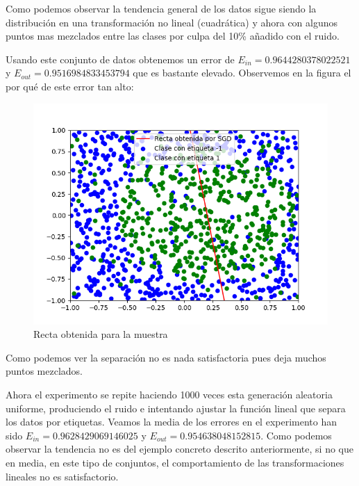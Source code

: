 \documentclass[12pt,a4paper]{article}
\begin{document}
Como podemos observar la tendencia general de los datos sigue siendo la distribución en una  transformación no lineal (cuadrática) y ahora con algunos puntos mas mezclados entre las clases por culpa del 10\% añadido con el ruido.

Usando este conjunto de datos obtenemos un error de $E_{in} = 0.9644280378022521$ y $E_{out} = 0.9516984833453794$ que es bastante elevado. Observemos en la figura el por qué de este error tan alto:

\begin{figure}[H]
	\centering
	\includegraphics[scale=0.8]{./Imagenes/ej2-2-4.png}
	\caption{Recta obtenida para la muestra}
	\label{ej2-2-4}
\end{figure}

Como podemos ver la separación no es nada satisfactoria pues deja muchos puntos mezclados.

Ahora el experimento se repite haciendo 1000 veces esta generación aleatoria uniforme, produciendo el ruido e intentando ajustar la función lineal que separa los datos por etiquetas. Veamos la media de los errores en el experimento han sido $E_{in} = 0.9628429069146025$ y $E_{out} = 0.954638048152815$. Como podemos observar la tendencia no es del ejemplo concreto descrito anteriormente, si no que en media, en este tipo de conjuntos, el comportamiento de las transformaciones lineales no es satisfactorio.
\end{document}
